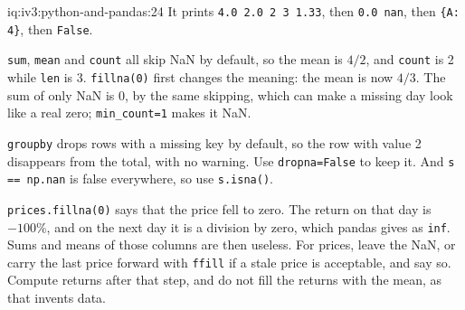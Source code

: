 \begin{solution}{iq:iv3:python-and-pandas:24}
It prints \texttt{4.0 2.0 2 3 1.33}, then \texttt{0.0 nan}, then \texttt{\{\textquotesingle A\textquotesingle: 4\}}, then \texttt{False}.

\texttt{sum}, \texttt{mean} and \texttt{count} all skip NaN by default, so the mean is $4 / 2$, and \texttt{count} is 2 while \texttt{len} is 3. \texttt{fillna(0)} first changes the meaning: the mean is now $4 / 3$. The sum of only NaN is 0, by the same skipping, which can make a missing day look like a real zero; \texttt{min\_count=1} makes it NaN.

\texttt{groupby} drops rows with a missing key by default, so the row with value 2 disappears from the total, with no warning. Use \texttt{dropna=False} to keep it. And \texttt{s == np.nan} is false everywhere, so use \texttt{s.isna()}.

\texttt{prices.fillna(0)} says that the price fell to zero. The return on that day is $-100\%$, and on the next day it is a division by zero, which pandas gives as \texttt{inf}. Sums and means of those columns are then useless. For prices, leave the NaN, or carry the last price forward with \texttt{ffill} if a stale price is acceptable, and say so. Compute returns after that step, and do not fill the returns with the mean, as that invents data.

\end{solution}

